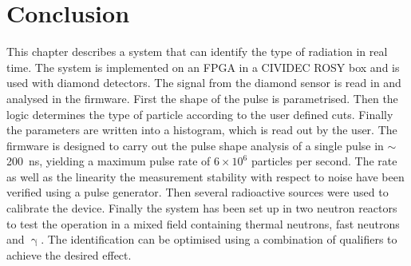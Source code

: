 \section{Conclusion}
\label{sec:conclcurrent}
This chapter describes a system that can identify the type of radiation in real time. The system is implemented on an FPGA in a CIVIDEC ROSY box and is used with diamond detectors. The signal from the diamond sensor is read in and analysed in the firmware. First the shape of the pulse is parametrised. Then the logic determines the type of particle according to the user defined cuts. Finally the parameters are written into a histogram, which is read out by the user. The firmware is designed to carry out the pulse shape analysis of a single pulse in $\sim$200~ns, yielding a maximum pulse rate of $6\times10^6$ particles per second. The rate as well as the linearity the measurement stability with respect to noise have been verified using a pulse generator. Then several radioactive sources were used to calibrate the device. Finally the system has been set up in two neutron reactors to test the operation in a mixed field containing thermal neutrons, fast neutrons and $\upgamma$. The identification can be optimised using a combination of qualifiers to achieve the desired effect.


